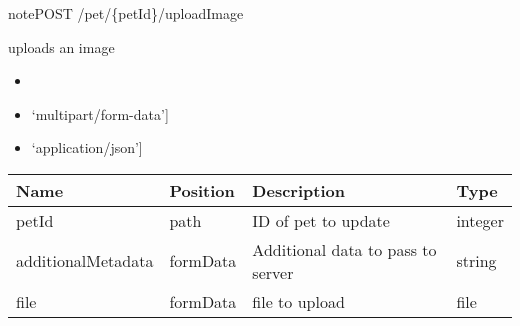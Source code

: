\documentclass[letterpaper,10pt,english]{sphinxmanual}
\begin{document}
\begin{sphinxadmonition}{note}{POST /pet/\{petId\}/uploadImage}

uploads an image\begin{itemize}
\item {} 

\item {} 
\sphinxstylestrong{Consumes: 
}{[}‘multipart/form-data’{]}

\item {} 
\sphinxstylestrong{Produces: 
}{[}‘application/json’{]}

\end{itemize}




\begin{savenotes}\sphinxattablestart
\centering
\begin{tabulary}{\linewidth}[t]{|T|T|T|T|}
\hline
\sphinxstyletheadfamily 
Name
&\sphinxstyletheadfamily 
Position
&\sphinxstyletheadfamily 
Description
&\sphinxstyletheadfamily 
Type
\\
\hline
petId
&
path
&
ID of pet to update
&
integer
\\
\hline
additionalMetadata
&
formData
&
Additional data to pass to server
&
string
\\
\hline
file
&
formData
&
file to upload
&
file
\\
\hline
\end{tabulary}
\par
\sphinxattableend\end{savenotes}


\end{sphinxadmonition}
\end{document}
